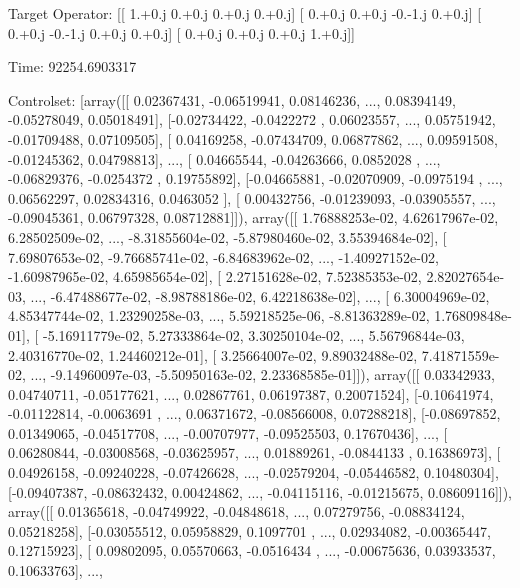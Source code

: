 \documentclass{article}
\begin{document}
Target Operator: [[ 1.+0.j  0.+0.j  0.+0.j  0.+0.j]
 [ 0.+0.j  0.+0.j -0.-1.j  0.+0.j]
 [ 0.+0.j -0.-1.j  0.+0.j  0.+0.j]
 [ 0.+0.j  0.+0.j  0.+0.j  1.+0.j]]

Time: 92254.6903317

Controlset: [array([[ 0.02367431, -0.06519941,  0.08146236, ...,  0.08394149,
        -0.05278049,  0.05018491],
       [-0.02734422, -0.0422272 ,  0.06023557, ...,  0.05751942,
        -0.01709488,  0.07109505],
       [ 0.04169258, -0.07434709,  0.06877862, ...,  0.09591508,
        -0.01245362,  0.04798813],
       ..., 
       [ 0.04665544, -0.04263666,  0.0852028 , ..., -0.06829376,
        -0.0254372 ,  0.19755892],
       [-0.04665881, -0.02070909, -0.0975194 , ...,  0.06562297,
         0.02834316,  0.0463052 ],
       [ 0.00432756, -0.01239093, -0.03905557, ..., -0.09045361,
         0.06797328,  0.08712881]]), array([[  1.76888253e-02,   4.62617967e-02,   6.28502509e-02, ...,
         -8.31855604e-02,  -5.87980460e-02,   3.55394684e-02],
       [  7.69807653e-02,  -9.76685741e-02,  -6.84683962e-02, ...,
         -1.40927152e-02,  -1.60987965e-02,   4.65985654e-02],
       [  2.27151628e-02,   7.52385353e-02,   2.82027654e-03, ...,
         -6.47488677e-02,  -8.98788186e-02,   6.42218638e-02],
       ..., 
       [  6.30004969e-02,   4.85347744e-02,   1.23290258e-03, ...,
          5.59218525e-06,  -8.81363289e-02,   1.76809848e-01],
       [ -5.16911779e-02,   5.27333864e-02,   3.30250104e-02, ...,
          5.56796844e-03,   2.40316770e-02,   1.24460212e-01],
       [  3.25664007e-02,   9.89032488e-02,   7.41871559e-02, ...,
         -9.14960097e-03,  -5.50950163e-02,   2.23368585e-01]]), array([[ 0.03342933,  0.04740711, -0.05177621, ...,  0.02867761,
         0.06197387,  0.20071524],
       [-0.10641974, -0.01122814, -0.0063691 , ...,  0.06371672,
        -0.08566008,  0.07288218],
       [-0.08697852,  0.01349065, -0.04517708, ..., -0.00707977,
        -0.09525503,  0.17670436],
       ..., 
       [ 0.06280844, -0.03008568, -0.03625957, ...,  0.01889261,
        -0.0844133 ,  0.16386973],
       [ 0.04926158, -0.09240228, -0.07426628, ..., -0.02579204,
        -0.05446582,  0.10480304],
       [-0.09407387, -0.08632432,  0.00424862, ..., -0.04115116,
        -0.01215675,  0.08609116]]), array([[ 0.01365618, -0.04749922, -0.04848618, ...,  0.07279756,
        -0.08834124,  0.05218258],
       [-0.03055512,  0.05958829,  0.1097701 , ...,  0.02934082,
        -0.00365447,  0.12715923],
       [ 0.09802095,  0.05570663, -0.0516434 , ..., -0.00675636,
         0.03933537,  0.10633763],
       ..., 
\end{document}
